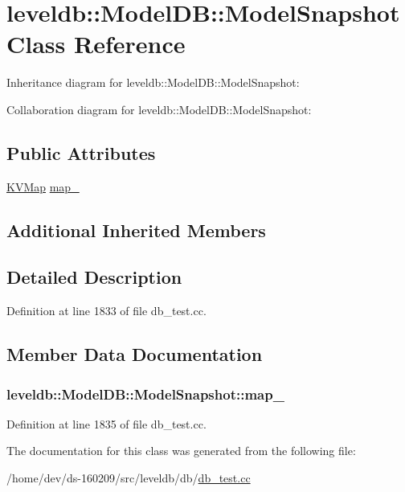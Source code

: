 \hypertarget{classleveldb_1_1_model_d_b_1_1_model_snapshot}{}\section{leveldb\+:\+:Model\+D\+B\+:\+:Model\+Snapshot Class Reference}
\label{classleveldb_1_1_model_d_b_1_1_model_snapshot}


Inheritance diagram for leveldb\+:\+:Model\+D\+B\+:\+:Model\+Snapshot\+:


Collaboration diagram for leveldb\+:\+:Model\+D\+B\+:\+:Model\+Snapshot\+:
\subsection*{Public Attributes}
\begin{DoxyCompactItemize}
\item 
\hyperlink{namespaceleveldb_aac1e50450147be263e08252c6700f7a7}{K\+V\+Map} \hyperlink{classleveldb_1_1_model_d_b_1_1_model_snapshot_a7ae02397c293072b78874d0c073a10c5}{map\+\_\+}
\end{DoxyCompactItemize}
\subsection*{Additional Inherited Members}


\subsection{Detailed Description}


Definition at line 1833 of file db\+\_\+test.\+cc.



\subsection{Member Data Documentation}
\hypertarget{classleveldb_1_1_model_d_b_1_1_model_snapshot_a7ae02397c293072b78874d0c073a10c5}{}
\subsubsection[{map\+\_\+}]{ leveldb\+::\+Model\+D\+B\+::\+Model\+Snapshot\+::map\+\_\+}\label{classleveldb_1_1_model_d_b_1_1_model_snapshot_a7ae02397c293072b78874d0c073a10c5}


Definition at line 1835 of file db\+\_\+test.\+cc.



The documentation for this class was generated from the following file\+:\begin{DoxyCompactItemize}
\item 
/home/dev/ds-\/160209/src/leveldb/db/\hyperlink{db__test_8cc}{db\+\_\+test.\+cc}\end{DoxyCompactItemize}
